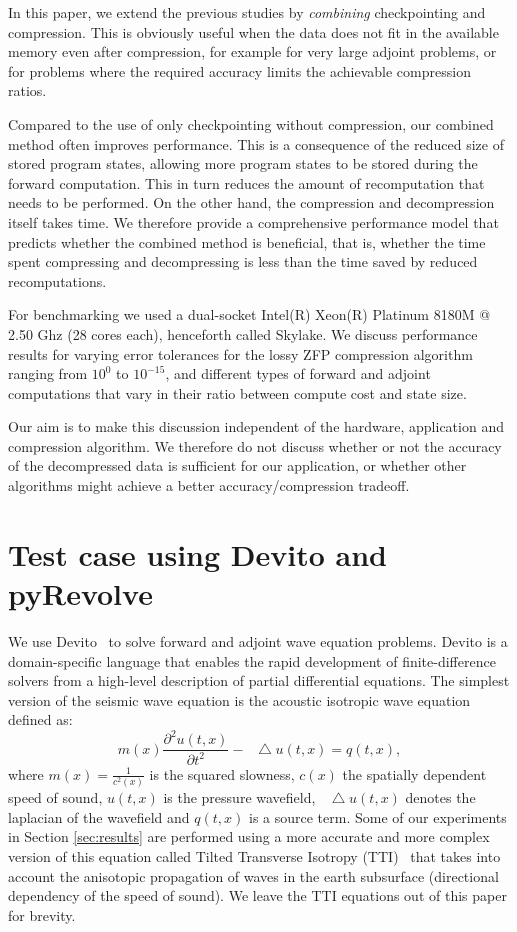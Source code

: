\documentclass[conference]{IEEEtran}
\newcommand*\Laplace{\mathop{}\!\mathbin\bigtriangleup}
\begin{document}
In this paper, we extend the previous studies by \emph{combining} checkpointing
and compression. This is obviously useful when the data does not fit in the
available memory even after compression, for example for very large adjoint
problems, or for problems where the required accuracy limits the achievable
compression ratios.

Compared to the use of only checkpointing without compression, our
combined method often improves performance. This is a consequence of
the reduced size of stored program states, allowing more program
states to be stored during the forward computation. This in turn
reduces the amount of recomputation that needs to be performed. On the
other hand, the compression and decompression itself takes time. We
therefore provide a comprehensive performance model that predicts
whether the combined method is beneficial, that is, whether the time
spent compressing and decompressing is less than the time saved by
reduced recomputations.

For benchmarking we used a dual-socket
Intel(R) Xeon(R) Platinum 8180M @ 2.50 Ghz (28 cores each), henceforth
called Skylake. We discuss performance results for varying error tolerances for
the lossy ZFP compression algorithm ranging from $10^0$ to $10^{-15}$, and different
types of forward and adjoint computations that vary in their ratio between
compute cost and state size. 

Our aim is to make this discussion independent of the hardware, application and
compression algorithm. We therefore do not discuss whether or not the accuracy
of the decompressed data is sufficient for our application, or whether
other algorithms might achieve a better accuracy/compression tradeoff.

\section{Test case using Devito and pyRevolve}
We use Devito~\cite{devito-api,devito-compiler} to solve forward and adjoint
wave equation problems. Devito is a domain-specific language that enables the
rapid development of finite-difference solvers from a high-level description
of partial differential equations. The simplest version of the seismic wave
equation is the acoustic isotropic wave equation defined as:
\begin{equation}
m(x)\frac{\partial^2 u(t, x)}{\partial t^2} - \Laplace u(t, x) = q(t, x),
\label{eqn:wave}
\end{equation}
where $m(x) = \frac{1}{c^2(x)}$ is the squared slowness, $c(x)$ the spatially
dependent speed of sound, $u(t, x)$ is the pressure wavefield, $\Laplace u(t, x)$ denotes the laplacian of the wavefield and $q(t, x)$ is a source term.
Some of our experiments in Section \ref{sec:results} are performed using a more accurate
and more complex version of this equation called Tilted Transverse Isotropy
(TTI)~\cite{zhang2011stable} that takes into account the anisotopic propagation of waves in the earth subsurface (directional dependency of the speed of sound). We leave the TTI equations out of this paper
for brevity. 
\end{document}
